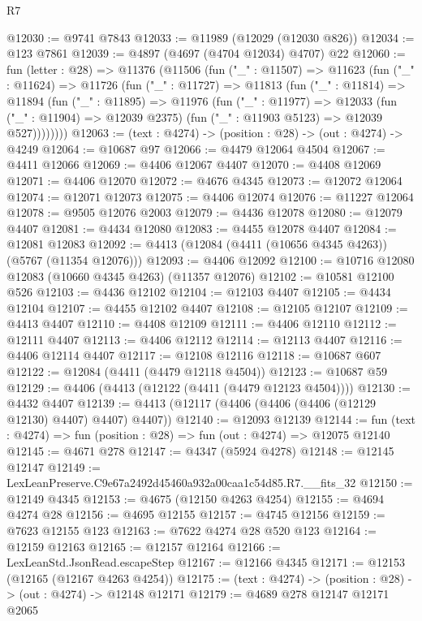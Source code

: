 \begin{lexlean}{R7}
\begin{coremodule}
@12030 := @9741 @7843
@12033 := @11989 (@12029 (@12030 @826))
@12034 := @123 @7861
@12039 := @4897 (@4697 (@4704 @12034) @4707) @22
@12060 := fun (letter : @28) =>
  @11376
    (@11506
      (fun ("_" : @11507) =>
      @11623
        (fun ("_" : @11624) =>
        @11726
          (fun ("_" : @11727) =>
          @11813
            (fun ("_" : @11814) =>
            @11894
              (fun ("_" : @11895) =>
              @11976
                (fun ("_" : @11977) =>
                @12033
                  (fun ("_" : @11904) => @12039 @2375)
                  (fun ("_" : @11903 @5123) => @12039 @527))))))))
@12063 := (text : @4274) -> (position : @28) -> (out : @4274) -> @4249
@12064 := @10687 @97
@12066 := @4479 @12064 @4504
@12067 := @4411 @12066
@12069 := @4406 @12067 @4407
@12070 := @4408 @12069
@12071 := @4406 @12070
@12072 := @4676 @4345
@12073 := @12072 @12064
@12074 := @12071 @12073
@12075 := @4406 @12074
@12076 := @11227 @12064
@12078 := @9505 @12076 @2003
@12079 := @4436 @12078
@12080 := @12079 @4407
@12081 := @4434 @12080
@12083 := @4455 @12078 @4407
@12084 := @12081 @12083
@12092 := @4413 (@12084 (@4411 (@10656 @4345 @4263)) (@5767 (@11354 @12076)))
@12093 := @4406 @12092
@12100 := @10716 @12080 @12083 (@10660 @4345 @4263) (@11357 @12076)
@12102 := @10581 @12100 @526
@12103 := @4436 @12102
@12104 := @12103 @4407
@12105 := @4434 @12104
@12107 := @4455 @12102 @4407
@12108 := @12105 @12107
@12109 := @4413 @4407
@12110 := @4408 @12109
@12111 := @4406 @12110
@12112 := @12111 @4407
@12113 := @4406 @12112
@12114 := @12113 @4407
@12116 := @4406 @12114 @4407
@12117 := @12108 @12116
@12118 := @10687 @607
@12122 := @12084 (@4411 (@4479 @12118 @4504))
@12123 := @10687 @59
@12129 := @4406 (@4413 (@12122 (@4411 (@4479 @12123 @4504))))
@12130 := @4432 @4407
@12139 := @4413 (@12117 (@4406 (@4406 (@4406 (@12129 @12130) @4407) @4407) @4407))
@12140 := @12093 @12139
@12144 := fun (text : @4274) => fun (position : @28) => fun (out : @4274) => @12075 @12140
@12145 := @4671 @278
@12147 := @4347 (@5924 @4278)
@12148 := @12145 @12147
@12149 := LexLeanPreserve.C9e67a2492d45460a932a00caa1c54d85.R7.__fits_32
@12150 := @12149 @4345
@12153 := @4675 (@12150 @4263 @4254)
@12155 := @4694 @4274 @28
@12156 := @4695 @12155
@12157 := @4745 @12156
@12159 := @7623 @12155 @123
@12163 := @7622 @4274 @28 @520 @123
@12164 := @12159 @12163
@12165 := @12157 @12164
@12166 := LexLeanStd.JsonRead.escapeStep
@12167 := @12166 @4345
@12171 := @12153 (@12165 (@12167 @4263 @4254))
@12175 := (text : @4274) -> (position : @28) -> (out : @4274) -> @12148 @12171
@12179 := @4689 @278 @12147 @12171 @2065

\end{coremodule}
\end{lexlean}
